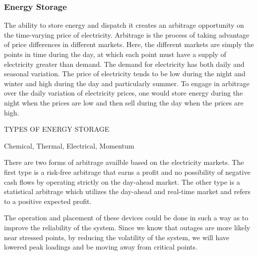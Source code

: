 \subsubsection{Energy Storage}
The ability to store energy and dispatch it creates an arbitrage opportunity on the time-varying price of electricity.  Arbitrage is the process of taking advantage of price differences in different markets.  Here, the different markets are simply the points in time during the day, at which each point must have a supply of electricity greater than demand.  The demand for electricity has both daily and seasonal variation.  The price of electricity tends to be low during the night and winter and high during the day and particularly summer.  To engage in arbitrage over the daily variation of electricity prices, one would store energy during the night when the prices are low and then sell during the day when the prices are high.  

TYPES OF ENERGY STORAGE

Chemical, Thermal, Electrical, Momentum

There are two forms of arbitrage availble based on the electricity markets.  The first type is a risk-free arbitrage that earns a profit and no possibility of negative cash flows by operating strictly on the day-ahead market.  The other type is a statistical arbitrage which utilizes the day-ahead and real-time market and refers to a positive expected profit.    

The operation and placement of these devices could be done in such a way as to improve the reliability of the system.  Since we know that outages are more likely near stressed points, by reducing the volatility of the system, we will have lowered peak loadings and be moving away from critical points.

